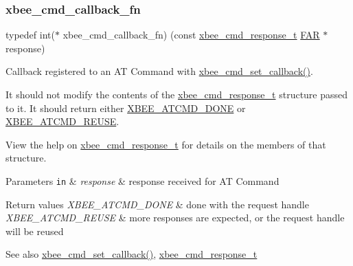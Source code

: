 \subsubsection{\texorpdfstring{xbee\+\_\+cmd\+\_\+callback\+\_\+fn}{xbee\_cmd\_callback\_fn}}
{\footnotesize\ttfamily typedef int($\ast$ xbee\+\_\+cmd\+\_\+callback\+\_\+fn) (const \hyperlink{structxbee__cmd__response__t}{xbee\+\_\+cmd\+\_\+response\+\_\+t} \hyperlink{group__hal_gaef060b3456fdcc093a7210a762d5f2ed}{F\+AR} $\ast$response)}



Callback registered to an AT Command with \hyperlink{group__xbee__atcmd_ga0a5d2e2e87743061c46abd53e379e014}{xbee\+\_\+cmd\+\_\+set\+\_\+callback()}. 

It should not modify the contents of the \hyperlink{structxbee__cmd__response__t}{xbee\+\_\+cmd\+\_\+response\+\_\+t} structure passed to it. It should return either \hyperlink{group__xbee__atcmd_gad51a6fee7843df5a5bfd6f3957465426}{X\+B\+E\+E\+\_\+\+A\+T\+C\+M\+D\+\_\+\+D\+O\+NE} or \hyperlink{group__xbee__atcmd_ga9a5078393806d67903c87b3c82597fb1}{X\+B\+E\+E\+\_\+\+A\+T\+C\+M\+D\+\_\+\+R\+E\+U\+SE}.

View the help on \hyperlink{structxbee__cmd__response__t}{xbee\+\_\+cmd\+\_\+response\+\_\+t} for details on the members of that structure.


\begin{DoxyParams}[1]{Parameters}
\mbox{\tt in}  & {\em response} & response received for AT Command\\
\hline
\end{DoxyParams}

\begin{DoxyRetVals}{Return values}
{\em X\+B\+E\+E\+\_\+\+A\+T\+C\+M\+D\+\_\+\+D\+O\+NE} & done with the request handle \\
\hline
{\em X\+B\+E\+E\+\_\+\+A\+T\+C\+M\+D\+\_\+\+R\+E\+U\+SE} & more responses are expected, or the request handle will be reused\\
\hline
\end{DoxyRetVals}
\begin{DoxySeeAlso}{See also}
\hyperlink{group__xbee__atcmd_ga0a5d2e2e87743061c46abd53e379e014}{xbee\+\_\+cmd\+\_\+set\+\_\+callback()}, \hyperlink{structxbee__cmd__response__t}{xbee\+\_\+cmd\+\_\+response\+\_\+t} 
\end{DoxySeeAlso}
\mbox{\label{group__xbee__atcmd_ga7909235eb77ba64c93742f8f9013d7fb}} 
